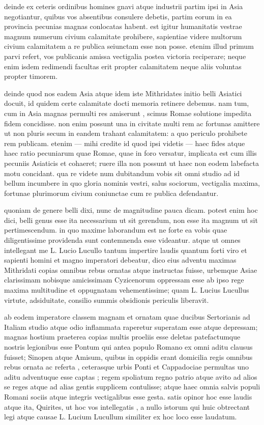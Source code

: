  deinde ex ceteris ordinibus homines gnavi atque industrii partim ipsi in Asia negotiantur, quibus vos absentibus consulere debetis, partim eorum in ea provincia pecunias magnas conlocatas habent. est igitur humanitatis vestrae magnum numerum civium calamitate prohibere, sapientiae videre multorum civium calamitatem a re publica seiunctam esse non posse. etenim illud primum parvi refert, vos publicanis amissa vectigalia postea victoria reciperare; neque enim isdem redimendi facultas erit propter calamitatem neque aliis voluntas propter timorem.

 deinde quod nos eadem Asia atque idem iste Mithridates initio belli Asiatici docuit, id quidem certe calamitate docti memoria retinere debemus. nam tum, cum in Asia magnas permulti res amiserunt , scimus Romae solutione impedita fidem concidisse. non enim possunt una in civitate multi rem ac fortunas amittere ut non pluris secum in eandem trahant calamitatem: a quo periculo prohibete rem publicam. etenim — mihi credite id quod ipsi videtis — haec fides atque haec ratio pecuniarum quae Romae, quae in foro versatur, implicata est cum illis pecuniis Asiaticis et cohaeret; ruere illa non possunt ut haec non eodem labefacta motu concidant. qua re videte num dubitandum vobis sit omni studio ad id bellum incumbere in quo gloria nominis vestri, salus sociorum, vectigalia maxima, fortunae plurimorum civium coniunctae cum re publica defendantur.

 quoniam de genere belli dixi, nunc de magnitudine pauca dicam. potest enim hoc dici, belli genus esse ita necessarium ut sit gerendum, non esse ita magnum ut sit pertimescendum. in quo maxime laborandum est ne forte ea vobis quae diligentissime providenda sunt contemnenda esse videantur. atque ut omnes intellegant me L. Lucio Lucullo tantum impertire laudis quantum forti viro et sapienti homini et magno imperatori debeatur, dico eius adventu maximas Mithridati copias omnibus rebus ornatas atque instructas fuisse, urbemque Asiae clarissimam nobisque amicissimam Cyzicenorum oppressam esse ab ipso rege maxima multitudine et oppugnatam vehementissime; quam L. Lucius Lucullus virtute, adsiduitate, consilio summis obsidionis periculis liberavit.

 ab eodem imperatore classem magnam et ornatam quae ducibus Sertorianis ad Italiam studio atque odio inflammata raperetur superatam esse atque depressam; magnas hostium praeterea copias multis proeliis esse deletas patefactumque nostris legionibus esse Pontum qui antea populo Romano ex omni aditu clausus fuisset; Sinopen atque Amisum, quibus in oppidis erant domicilia regis omnibus rebus ornata ac referta , ceterasque urbis Ponti et Cappadociae permultas uno aditu adventuque esse captas ; regem spoliatum regno patrio atque avito ad alios se reges atque ad alias gentis supplicem contulisse; atque haec omnia salvis populi Romani sociis atque integris vectigalibus esse gesta. satis opinor hoc esse laudis atque ita, Quirites, ut hoc vos intellegatis , a nullo istorum qui huic obtrectant legi atque causae L. Lucium Lucullum similiter ex hoc loco esse laudatum.

